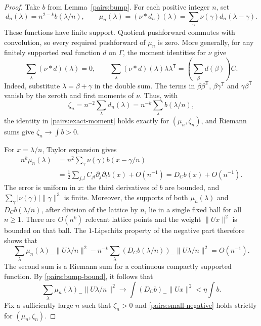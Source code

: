 \begin{proof}
Take $b$ from Lemma~\ref{pairs:bump}. For each positive integer $n$, set
\[
 d_n(\lambda)=n^{2-k}b(\lambda/n),
 \qquad
 \mu_n(\lambda)=(\nu*d_n)(\lambda)
      =\sum_\gamma\nu(\gamma)d_n(\lambda-\gamma).
\]
These functions have finite support. Quotient pushforward commutes with
convolution, so every required pushforward of $\mu_n$ is zero.
More generally, for any finitely supported real function $d$ on $\Gamma$,
the moment identities for $\nu$ give
\begin{equation}\label{pairs:convolution-moments}
 \sum_\lambda(\nu*d)(\lambda)=0,
 \qquad
 \sum_\lambda(\nu*d)(\lambda)\lambda\lambda^{\mathsf T}
       =\left(\sum_\beta d(\beta)\right)C.
\end{equation}
Indeed, substitute $\lambda=\beta+\gamma$ in the double sum. The terms
in $\beta\beta^{\mathsf T}$, $\beta\gamma^{\mathsf T}$ and
$\gamma\beta^{\mathsf T}$ vanish by the zeroth and first moments of
$\nu$. Thus, with
\[
 \zeta_n=n^{-2}\sum_\lambda d_n(\lambda)
        =n^{-k}\sum_\lambda b(\lambda/n),
\]
the identity in \eqref{pairs:exact-moment} holds exactly for
$(\mu_n,\zeta_n)$, and Riemann sums give $\zeta_n\to\int b>0$.

For $x=\lambda/n$, Taylor expansion gives
\begin{align*}
 n^k\mu_n(\lambda)
 &=n^2\sum_\gamma\nu(\gamma)b(x-\gamma/n)\\
 &=\frac12\sum_{j,l}C_{jl}\partial_j\partial_l b(x)+O(n^{-1})
  =D_Cb(x)+O(n^{-1}).
\end{align*}
The error is uniform in $x$: the third derivatives of $b$ are bounded,
and $\sum_\gamma|\nu(\gamma)|\|\gamma\|^3$ is finite. Moreover, the
supports of both $\mu_n(\lambda)$ and $D_Cb(\lambda/n)$, after division
of the lattice by $n$, lie in a single fixed ball for all $n\geq1$.
There are $O(n^k)$ relevant lattice points and the weight $\|Ux\|^2$
is bounded on that ball. The $1$-Lipschitz property of the negative part
therefore shows that
\[
 \sum_\lambda\mu_n(\lambda)_-\|U\lambda/n\|^2
 -n^{-k}\sum_\lambda(D_Cb(\lambda/n))_-\|U\lambda/n\|^2
 =O(n^{-1}).
\]
The second sum is a Riemann sum for a continuous compactly supported
function. By \eqref{pairs:bump-bound}, it follows that
\[
 \sum_\lambda\mu_n(\lambda)_-\|U\lambda/n\|^2
 \longrightarrow\int(D_Cb)_-\|Ux\|^2
 <\eta\int b.
\]
Fix a sufficiently large $n$ such that $\zeta_n>0$ and
\eqref{pairs:small-negative} holds strictly for $(\mu_n,\zeta_n)$.


\end{proof}
